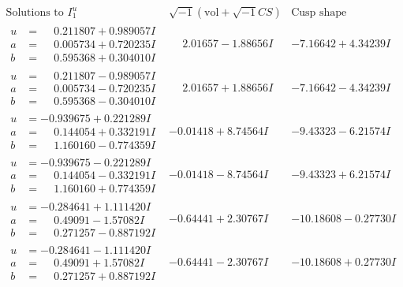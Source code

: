 \documentclass[1p]{elsarticle_modified}
\theoremstyle{definition}
\newcommand{\I}{\sqrt{-1}}
\begin{document}
$$\begin{array}{c|c|c}  
\text{Solutions to }I^u_{1}& \I (\text{vol} + \sqrt{-1}CS) & \text{Cusp shape}\\
 \hline 
\begin{aligned}
u &= \phantom{-}0.211807 + 0.989057 I \\
a &= \phantom{-}0.005734 + 0.720235 I \\
b &= \phantom{-}0.595368 + 0.304010 I\end{aligned}
 & \phantom{-}2.01657 - 1.88656 I & -7.16642 + 4.34239 I \\ \hline\begin{aligned}
u &= \phantom{-}0.211807 - 0.989057 I \\
a &= \phantom{-}0.005734 - 0.720235 I \\
b &= \phantom{-}0.595368 - 0.304010 I\end{aligned}
 & \phantom{-}2.01657 + 1.88656 I & -7.16642 - 4.34239 I \\ \hline\begin{aligned}
u &= -0.939675 + 0.221289 I \\
a &= \phantom{-}0.144054 + 0.332191 I \\
b &= \phantom{-}1.160160 - 0.774359 I\end{aligned}
 & -0.01418 + 8.74564 I & -9.43323 - 6.21574 I \\ \hline\begin{aligned}
u &= -0.939675 - 0.221289 I \\
a &= \phantom{-}0.144054 - 0.332191 I \\
b &= \phantom{-}1.160160 + 0.774359 I\end{aligned}
 & -0.01418 - 8.74564 I & -9.43323 + 6.21574 I \\ \hline\begin{aligned}
u &= -0.284641 + 1.111420 I \\
a &= \phantom{-}0.49091 - 1.57082 I \\
b &= \phantom{-}0.271257 - 0.887192 I\end{aligned}
 & -0.64441 + 2.30767 I & -10.18608 - 0.27730 I \\ \hline\begin{aligned}
u &= -0.284641 - 1.111420 I \\
a &= \phantom{-}0.49091 + 1.57082 I \\
b &= \phantom{-}0.271257 + 0.887192 I\end{aligned}
 & -0.64441 - 2.30767 I & -10.18608 + 0.27730 I \\ \hline\begin{aligned}

\end{aligned}
\end{array}$$
\end{document}

